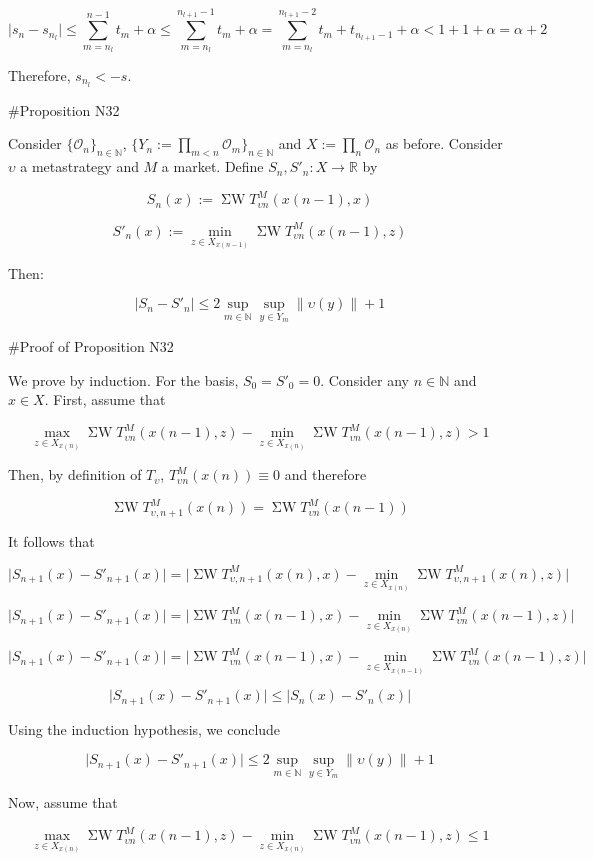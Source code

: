 \documentclass[a4paper]{article}
\newcommand{\Nats}{\mathbb{N}}
\newcommand{\Reals}{\mathbb{R}}
\newcommand{\Sq}[2]{\{#1\}_{#2 \in \Nats}}
\newcommand{\Sqn}[1]{\Sq{#1}{n}}
\newcommand{\Abs}[1]{\lvert #1 \rvert}
\newcommand{\Norm}[1]{\lVert #1 \rVert}
\newcommand{\Ob}{\mathcal{O}}
\newcommand{\SW}{\operatorname{\Sigma W}}
\begin{document}
$$\Abs{s_n-s_{n_l}} \leq \sum_{m=n_l}^{n - 1} t_m + \alpha \leq \sum_{m=n_l}^{n_{l+1} - 1} t_m  + \alpha = \sum_{m=n_l}^{n_{l+1} - 2} t_m + t_{n_{l+1}-1} + \alpha < 1 + 1  + \alpha = \alpha + 2$$

Therefore, ${s_{n_l} < -s}$.

\#Proposition N32

Consider ${\Sqn{\Ob_n}}$, ${\Sqn{Y_n:=\prod_{m < n} \Ob_m}}$ and ${X:=\prod_n \Ob_n}$ as before. Consider ${\upsilon}$ a metastrategy and ${M}$ a market. Define ${S_n,S'_n: X \rightarrow \Reals}$ by 

$$S_n(x):= \SW T^M_{\upsilon n}(x(n-1),x)$$

$$S'_n(x):= \min_{z \in X_{x(n-1)}} \SW T^M_{\upsilon n}(x(n-1),z)$$

Then: 

$${\Abs{S_n-S'_n} \leq 2 \sup_{m \in \Nats} \sup_{y \in Y_m} \Norm{\upsilon(y)}} + 1$$

\#Proof of Proposition N32

We prove by induction. For the basis, $S_0=S'_0=0$. Consider any ${n \in \Nats}$ and ${x \in X}$. First, assume that

$$\max_{z \in X_{x(n)}} \SW T^M_{\upsilon n}(x(n-1),z)-\min_{z \in X_{x(n)}} \SW T^M_{\upsilon n}(x(n-1),z) > 1$$

Then, by definition of ${T_\upsilon}$, ${T^M_{\upsilon n}}(x(n)) \equiv 0$ and therefore

$$\SW T^M_{\upsilon,n+1}(x(n))=\SW T^M_{\upsilon n}(x(n-1))$$

It follows that

$$\Abs{S_{n+1}(x)-S'_{n+1}(x)} = \Abs{\SW T^M_{\upsilon,n+1}(x(n),x) - \min_{z \in X_{x(n)}}\SW T^M_{\upsilon,n+1}(x(n),z)}$$

$$\Abs{S_{n+1}(x)-S'_{n+1}(x)} = \Abs{\SW T^M_{\upsilon n}(x(n-1),x) - \min_{z \in X_{x(n)}}\SW T^M_{\upsilon n}(x(n-1),z)}$$

$$\Abs{S_{n+1}(x)-S'_{n+1}(x)} = \Abs{\SW T^M_{\upsilon n}(x(n-1),x) - \min_{z \in X_{x(n-1)}}\SW T^M_{\upsilon n}(x(n-1),z)}$$

$$\Abs{S_{n+1}(x)-S'_{n+1}(x)} \leq \Abs{S_n(x)-S'_n(x)}$$

Using the induction hypothesis, we conclude

$$\Abs{S_{n+1}(x)-S'_{n+1}(x)} \leq 2 \sup_{m \in \Nats} \sup_{y \in Y_m} \Norm{\upsilon(y)} + 1$$

Now, assume that 

$$\max_{z \in X_{x(n)}} \SW T^M_{\upsilon n}(x(n-1),z)-\min_{z \in X_{x(n)}} \SW T^M_{\upsilon n}(x(n-1),z) \leq 1$$
\end{document}
